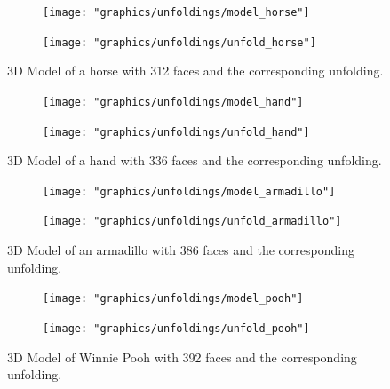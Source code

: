 \documentclass[draft,final]{vutinfth} %
\begin{document}
\begin{figure}
  \begin{subfigure}[b]{0.475\textwidth}
    \texttt{[image: "graphics/unfoldings/model\_horse"]}
  \end{subfigure}
  \begin{subfigure}[b]{0.475\textwidth}
    \texttt{[image: "graphics/unfoldings/unfold\_horse"]}
  \end{subfigure}
  
  \caption{3D Model of a horse with 312 faces and the corresponding unfolding.}
  \label{fig:horse}
\end{figure}

\begin{figure}
  \begin{subfigure}[b]{0.475\textwidth}
    \texttt{[image: "graphics/unfoldings/model\_hand"]}
  \end{subfigure}
  \begin{subfigure}[b]{0.475\textwidth}
    \texttt{[image: "graphics/unfoldings/unfold\_hand"]}
  \end{subfigure}
  
  \caption{3D Model of a hand with 336 faces and the corresponding unfolding.}
  \label{fig:hand}
\end{figure}

\begin{figure}
  \begin{subfigure}[b]{0.475\textwidth}
    \texttt{[image: "graphics/unfoldings/model\_armadillo"]}
  \end{subfigure}
  \begin{subfigure}[b]{0.475\textwidth}
    \texttt{[image: "graphics/unfoldings/unfold\_armadillo"]}
  \end{subfigure}
  
  \caption{3D Model of an armadillo with 386 faces and the corresponding unfolding.}
  \label{fig:armadillo}
\end{figure}

\begin{figure}
  \begin{subfigure}[b]{0.475\textwidth}
    \texttt{[image: "graphics/unfoldings/model\_pooh"]}
  \end{subfigure}
  \begin{subfigure}[b]{0.475\textwidth}
    \texttt{[image: "graphics/unfoldings/unfold\_pooh"]}
  \end{subfigure}
  
  \caption{3D Model of Winnie Pooh with 392 faces and the corresponding unfolding.}
  \label{fig:pooh}
\end{figure}
\end{document}
